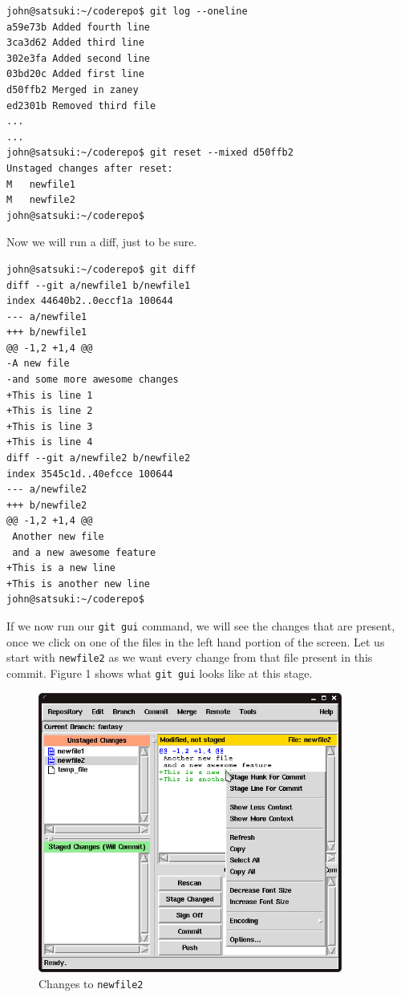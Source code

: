 \begin{Verbatim}[frame=leftline,framerule=1mm,fontsize=\relsize{-3}] 
john@satsuki:~/coderepo$ git log --oneline
a59e73b Added fourth line
3ca3d62 Added third line
302e3fa Added second line
03bd20c Added first line
d50ffb2 Merged in zaney
ed2301b Removed third file
...
...
john@satsuki:~/coderepo$ git reset --mixed d50ffb2
Unstaged changes after reset:
M	newfile1
M	newfile2
john@satsuki:~/coderepo$ 
\end{Verbatim}

Now we will run a diff, just to be sure.

\begin{Verbatim}[frame=leftline,framerule=1mm,fontsize=\relsize{-3}] 
john@satsuki:~/coderepo$ git diff
diff --git a/newfile1 b/newfile1
index 44640b2..0eccf1a 100644
--- a/newfile1
+++ b/newfile1
@@ -1,2 +1,4 @@
-A new file
-and some more awesome changes
+This is line 1
+This is line 2
+This is line 3
+This is line 4
diff --git a/newfile2 b/newfile2
index 3545c1d..40efcce 100644
--- a/newfile2
+++ b/newfile2
@@ -1,2 +1,4 @@
 Another new file
 and a new awesome feature
+This is a new line
+This is another new line
john@satsuki:~/coderepo$ 
\end{Verbatim}

If we now run our \texttt{git gui} command, we will see the changes that are present, once we click on one of the files in the left hand portion of the screen.  Let us start with \texttt{newfile2} as we want every change from that file present in this commit.  Figure 1 shows what \texttt{git gui} looks like at this stage.

\begin{figure}[hbt]
\centering
\includegraphics[width=10cm]{images/f-af5-d1.png}
\caption{Changes to \texttt{newfile2}}
\end{figure} 

